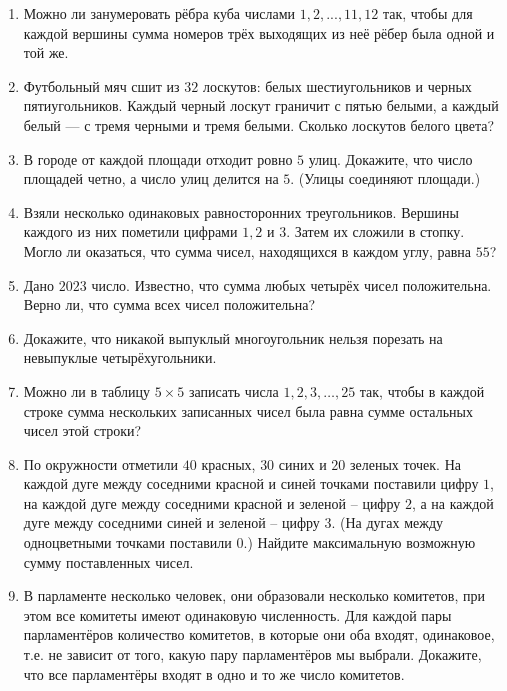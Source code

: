 \documentclass{article}
\begin{document}
\begin{enumerate}[label*=\protect\fbox{\arabic{enumi}}]
\item Можно ли занумеровать рёбра куба числами $1, 2, ..., 11, 12$ так, чтобы для каждой вершины сумма номеров трёх выходящих из неё рёбер была одной и той же.

\item Футбольный мяч сшит из $32$ лоскутов: белых шестиугольников и черных пятиугольников. Каждый черный лоскут граничит с пятью белыми, а каждый белый — с тремя черными и тремя белыми. Сколько лоскутов белого цвета?

\item В городе от каждой площади отходит ровно $5$ улиц. Докажите, что число площадей четно, а число улиц делится на $5$. (Улицы соединяют площади.)

\item Взяли несколько одинаковых равносторонних треугольников. Вершины каждого из них пометили цифрами $1, 2$ и $3$. Затем их сложили в стопку. Могло ли оказаться, что сумма чисел, находящихся в каждом углу, равна $55$?

\item Дано $2023$ число. Известно, что сумма любых четырёх чисел положительна. Верно ли, что сумма всех чисел положительна?

\item Докажите, что никакой выпуклый многоугольник нельзя порезать на невыпуклые четырёхугольники.

\item Можно ли в таблицу $5 \times 5$ записать числа $1, 2, 3,
\dots, 25$ так, чтобы в каждой строке сумма нескольких
записанных чисел была равна сумме остальных чисел
этой строки?

\item По окружности отметили $40$ красных, $30$ синих и $20$ зеленых точек. На каждой дуге между соседними красной и синей точками поставили цифру $1$, на каждой дуге между соседними красной и зеленой – цифру $2$, а на каждой дуге между соседними синей и зеленой – цифру $3$. (На дугах между одноцветными точками поставили $0$.) Найдите максимальную возможную сумму поставленных чисел.

\item В парламенте несколько человек, они образовали несколько комитетов, при этом все комитеты имеют одинаковую численность. Для каждой пары парламентёров количество комитетов, в которые они оба входят, одинаковое, т.е. не зависит от того, какую пару парламентёров мы выбрали. Докажите, что все парламентёры входят в одно и то же число комитетов.


\end{enumerate}
\end{document}
